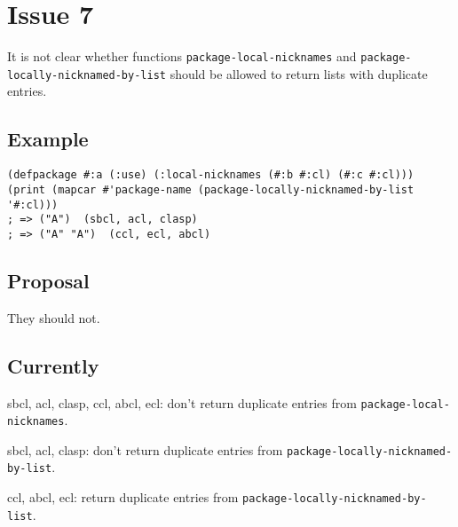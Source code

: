 \documentclass[11pt]{article}
\author{Grolter Bell}
\date{\today}
\title{}
\begin{document}
\section{Issue 7}
\label{sec:orgdf158b7}
It is not clear whether functions \texttt{package-local-nicknames} and
\texttt{package-locally-nicknamed-by-list} should be allowed to return lists with
duplicate entries.
\subsection{Example}
\label{sec:orgf4f9763}
\begin{verbatim}
(defpackage #:a (:use) (:local-nicknames (#:b #:cl) (#:c #:cl)))
(print (mapcar #'package-name (package-locally-nicknamed-by-list '#:cl)))
; => ("A")  (sbcl, acl, clasp)
; => ("A" "A")  (ccl, ecl, abcl)
\end{verbatim}
\subsection{Proposal}
\label{sec:org06a1b03}
They should not.
\subsection{Currently}
\label{sec:org1adc46d}
sbcl, acl, clasp, ccl, abcl, ecl: don't return duplicate entries from \texttt{package-local-nicknames}.

sbcl, acl, clasp: don't return duplicate entries from \texttt{package-locally-nicknamed-by-list}.

ccl, abcl, ecl: return duplicate entries from \texttt{package-locally-nicknamed-by-list}.
\end{document}
